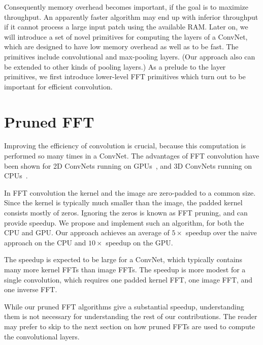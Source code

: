 \documentclass[conference]{./IEEEtran/IEEEtran}
\begin{document}
  Consequently memory overhead becomes important, if the goal is to
  maximize throughput.  An apparently faster algorithm may end up with
  inferior throughput if it cannot process a large input patch using
  the available RAM.  Later on, we will introduce a set of novel
  primitives for computing the layers of a ConvNet, which are designed
  to have low memory overhead as well as to be fast.  The primitives
  include convolutional and max-pooling layers.  (Our approach also
  can be extended to other kinds of pooling layers.)  As a prelude to
  the layer primitives, we first introduce lower-level FFT primitives
  which turn out to be important for efficient convolution.

\section{Pruned FFT}

  Improving the efficiency of convolution is crucial, because this
  computation is performed so many times in a ConvNet.  The advantages
  of FFT convolution have been shown for 2D ConvNets running on
  GPUs~\cite{mathieu-iclr-14,vasilache2014fast}, and 3D ConvNets
  running on CPUs~\cite{zlateski2015znn}.

  In FFT convolution the kernel and the image are zero-padded to a
  common size.  Since the kernel is typically much smaller than the
  image, the padded kernel consists mostly of zeros.  Ignoring the
  zeros is known as FFT pruning, and can provide speedup.  We propose
  and implement such an algorithm, for both the CPU and GPU. Our
  approach achieves an average of $5 \times$ speedup over the naive
  approach on the CPU and $10 \times$ speedup on the GPU.

  The speedup is expected to be large for a ConvNet, which typically
  contains many more kernel FFTs than image FFTs.  The speedup is more
  modest for a single convolution, which requires one padded kernel
  FFT, one image FFT, and one inverse FFT.

  While our pruned FFT algorithms give a substantial speedup,
  understanding them is not necessary for understanding the rest of
  our contributions.  The reader may prefer to skip to the next
  section on how pruned FFTs are used to compute the convolutional
  layers.
\end{document}
